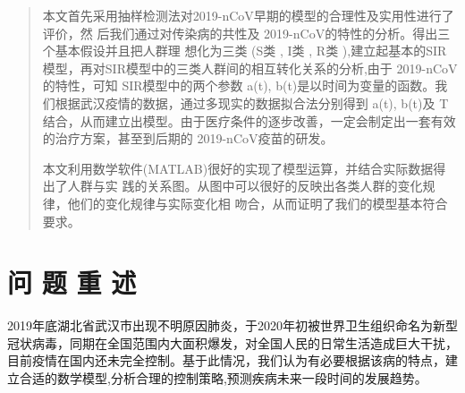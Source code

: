 \documentclass{article}
\begin{document}
\thispagestyle{empty}
\newpage
\setcounter{page}{1}
\maketitle
\begin{abstract}
本文首先采用抽样检测法对2019-nCoV早期的模型的合理性及实用性进行了评价，然
后我们通过对传染病的共性及 2019-nCoV的特性的分析。得出三个基本假设并且把人群理
想化为三类 (S类 , I类 , R类 ),建立起基本的SIR模型，再对SIR模型中的三类人群间的相互转化关系的分析,由于 2019-nCoV的特性，可知 SIR模型中的两个参数 a(t), b(t)是以时间为变量的函数。我们根据武汉疫情的数据，通过多现实的数据拟合法分别得到 a(t), b(t)及 T结合，从而建立出模型。由于医疗条件的逐步改善，一定会制定出一套有效的治疗方案，甚至到后期的 2019-nCoV疫苗的研发。

本文利用数学软件(MATLAB)很好的实现了模型运算，并结合实际数据得出了人群与实
践的关系图。从图中可以很好的反映出各类人群的变化规律，他们的变化规律与实际变化相
吻合，从而证明了我们的模型基本符合要求。
\end{abstract}
\section{问 题 重 述}
2019年底湖北省武汉市出现不明原因肺炎，于2020年初被世界卫生组织命名为新型冠状病毒，同期在全国范围内大面积爆发，对全国人民的日常生活造成巨大干扰，目前疫情在国内还未完全控制。基于此情况，我们认为有必要根据该病的特点，建
立合适的数学模型,分析合理的控制策略,预测疾病未来一段时间的发展趋势。
\end{document}
